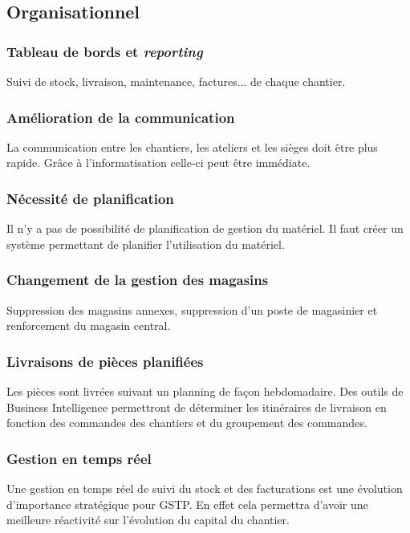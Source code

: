 \subsection{Organisationnel}

\subsubsection{Tableau de bords et {\sl reporting}}

Suivi de stock, livraison, maintenance, factures... de chaque chantier.

\subsubsection{Amélioration de la communication}

La communication entre les chantiers, les ateliers et les sièges doit être
plus rapide. Grâce à l’informatisation celle-ci peut être immédiate.

\subsubsection{Nécessité de planification}

Il n’y a pas de possibilité de planification de gestion du matériel. 
Il faut créer un système permettant de planifier l’utilisation du matériel.

\subsubsection{Changement de la gestion des magasins}

Suppression des magasins annexes, suppression d’un poste de magasinier et
renforcement du magasin central.

\subsubsection{Livraisons de pièces planifiées}
Les pièces sont livrées suivant un planning de façon hebdomadaire. 
Des outils de Business Intelligence permettront de déterminer les
itinéraires de livraison en fonction des commandes des chantiers et du
groupement des commandes.

\subsubsection{Gestion en temps réel}
Une gestion en temps réel de suivi du stock et des facturations
est une évolution 
d’importance stratégique pour GSTP. En effet cela permettra 
d’avoir une meilleure
 réactivité sur l'évolution du capital du chantier.

